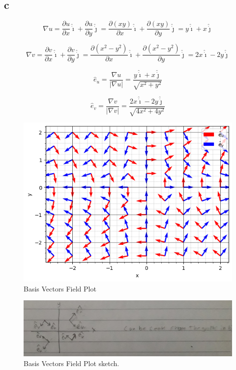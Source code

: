 \documentclass[12pt]{article}
\begin{document}
\subsection{c}

\[
    \nabla u = \frac{ \partial u}{\partial x} \hat{\dot{\imath}} + \frac{ \partial u}{\partial y}  \hat{\dot{\jmath}} = \frac{ \partial (xy)}{\partial x}  \hat{\dot{\imath}} + \frac{ \partial (xy)}{\partial y}  \hat{\dot{\jmath}} = y  \hat{\dot{\imath}} + x  \hat{\dot{\jmath}}
\]

\[
    \nabla v = \frac{ \partial v}{\partial x} \hat{\dot{\imath}} + \frac{ \partial v}{\partial y}  \hat{\dot{\jmath}} = \frac{ \partial (x^2 - y^2)}{\partial x}  \hat{\dot{\imath}} + \frac{ \partial (x^2 - y^2)}{\partial y}  \hat{\dot{\jmath}} = 2x  \hat{\dot{\imath}} - 2y  \hat{\dot{\jmath}}
\]

\[
    \hat{e}_u = \frac{\nabla u}{|\nabla u|} = \frac{y  \hat{\dot{\imath}} + x  \hat{\dot{\jmath}}}{\sqrt{x^2 + y^2}}
\]

\[
    \hat{e}_v = \frac{\nabla v}{|\nabla v|} = \frac{2x  \hat{\dot{\imath}} - 2y  \hat{\dot{\jmath}}}{\sqrt{4x^2 + 4y^2}}
\]

\begin{figure}[H]
    \includegraphics[width=\linewidth]{Q1C.png}
    \caption{Basis Vectors Field Plot}
    \label{fig:Q1C}
\end{figure}

\begin{figure}[H]
    \includegraphics[width=\linewidth]{Q1C.jpg}
    \caption{Basis Vectors Field Plot sketch.}
    \label{fig:Q1C2}
\end{figure}
\end{document}
